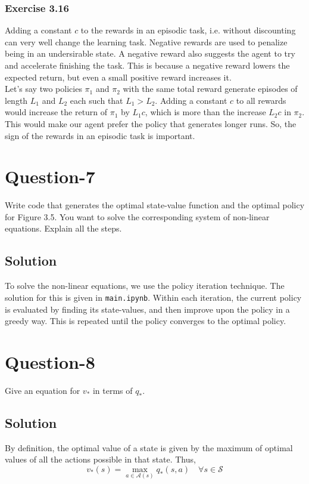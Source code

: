 \documentclass[11pt]{article}
\begin{document}
    \subsubsection*{Exercise 3.16}
    Adding a constant $c$ to the rewards in an episodic task, i.e. without discounting can very well
    change the learning task. Negative rewards are used to penalize being in an undersirable state.
    A negative reward also suggests the agent to try and accelerate finishing the task. This is because
    a negative reward lowers the expected return, but even a small positive reward increases it. \\
    Let's say two policies $\pi_{1}$ and $\pi_{2}$ with the same total reward generate episodes of length
    $L_{1}$ and $L_{2}$ each such that $L_{1} > L_{2}$. Adding a constant $c$ to all rewards would increase
    the return of $\pi_{1}$ by $L_{1}c$, which is more than the increase $L_{2}c$ in $\pi_{2}$. This
    would make our agent prefer the policy that generates longer runs. So, the sign of the rewards in
    an episodic task is important.

    \section*{Question-7}
    Write code that generates the optimal state-value function and the optimal policy for Figure 3.5.
    You want to solve the corresponding system of non-linear equations. Explain all the steps.

    \subsection*{Solution}
    To solve the non-linear equations, we use the policy iteration technique. The solution for this is given
    in \texttt{main.ipynb}. Within each iteration, the current policy is evaluated
    by finding its state-values, and then improve upon the policy in a greedy way. This is repeated until
    the policy converges to the optimal policy.

    \section*{Question-8}
    Give an equation for $v_{*}$ in terms of $q_{*}$.

    \subsection*{Solution}
    By definition, the optimal value of a state is given by the maximum of optimal values of all the
    actions possible in that state. Thus,
    $$v_{*}(s) = \max_{a \in \mathcal{A}(s)} q_{*}(s, a) \quad \forall s \in \mathcal{S}$$
\end{document}
